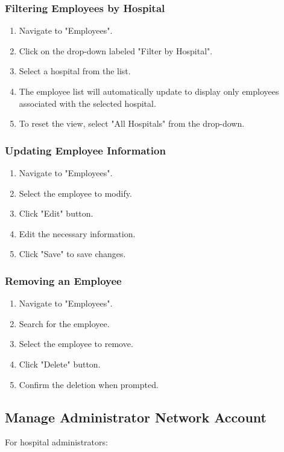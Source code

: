 \documentclass[12pt, titlepage]{article}
\begin{document}
\subsubsection{Filtering Employees by Hospital}
\begin{enumerate}
    \item Navigate to "Employees".
    \item Click on the drop-down labeled "Filter by Hospital".
    \item Select a hospital from the list.
    \item The employee list will automatically update to display only employees associated with the selected hospital.
    \item To reset the view, select "All Hospitals" from the drop-down.
\end{enumerate}

\subsubsection{Updating Employee Information}
\begin{enumerate}
\item Navigate to "Employees".
\item Select the employee to modify.
\item Click "Edit" button.
\item Edit the necessary information.
\item Click "Save" to save changes.
\end{enumerate}

\subsubsection{Removing an Employee}
\begin{enumerate}
\item Navigate to "Employees".
\item Search for the employee.
\item Select the employee to remove.
\item Click "Delete" button.
\item Confirm the deletion when prompted.
\end{enumerate}

\subsection{Manage Administrator Network Account}
For hospital administrators:
\end{document}
